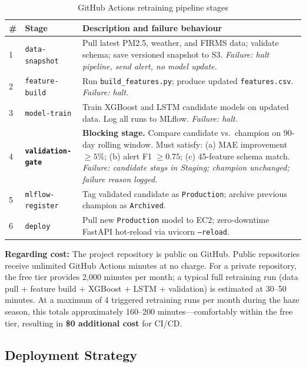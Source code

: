 \documentclass[12pt,a4paper]{report}
\begin{document}
\begin{table}[H]
\centering
\caption{GitHub Actions retraining pipeline stages}
\label{tab:github_stages}
\begin{tabularx}{\textwidth}{@{}p{0.4cm}p{4.0cm}X@{}}
\toprule
\textbf{\#} & \textbf{Stage} & \textbf{Description and failure behaviour} \\
\midrule
1 & \texttt{data-snapshot}   & Pull latest PM2.5, weather, and FIRMS data; validate schema; save versioned snapshot to S3. \textit{Failure: halt pipeline, send alert, no model update.} \\[4pt]
2 & \texttt{feature-build}   & Run \texttt{build\_features.py}; produce updated \texttt{features.csv}. \textit{Failure: halt.} \\[4pt]
3 & \texttt{model-train}     & Train XGBoost and LSTM candidate models on updated data. Log all runs to MLflow. \textit{Failure: halt.} \\[4pt]
4 & \textbf{\texttt{validation-gate}} & \textbf{Blocking stage.} Compare candidate vs.\ champion on 90-day rolling window. Must satisfy: (a) MAE improvement $\geq 5\%$; (b) alert F1 $\geq 0.75$; (c) 45-feature schema match. \textit{Failure: candidate stays in Staging; champion unchanged; failure reason logged.} \\[4pt]
5 & \texttt{mlflow-register} & Tag validated candidate as \texttt{Production}; archive previous champion as \texttt{Archived}. \\[4pt]
6 & \texttt{deploy}          & Pull new \texttt{Production} model to EC2; zero-downtime FastAPI hot-reload via uvicorn \texttt{--reload}. \\
\bottomrule
\end{tabularx}
\end{table}

\textbf{Regarding cost:} The project repository is public on GitHub. Public repositories receive unlimited GitHub Actions minutes at no charge. For a private repository, the free tier provides 2,000 minutes per month; a typical full retraining run (data pull + feature build + XGBoost + LSTM + validation) is estimated at 30--50 minutes. At a maximum of 4 triggered retraining runs per month during the haze season, this totals approximately 160--200 minutes---comfortably within the free tier, resulting in \textbf{\$0 additional cost} for CI/CD.

\subsection{Deployment Strategy}
\end{document}
